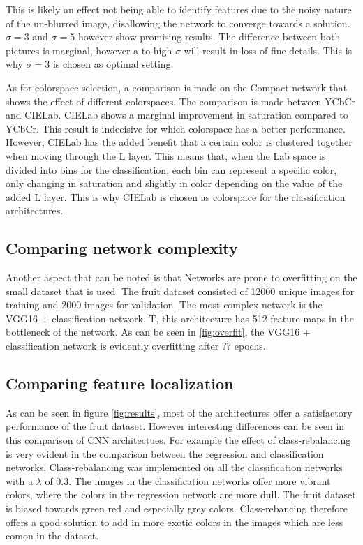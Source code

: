 {\color{red}
This is likely an effect not being able to identify features due to the noisy nature of the un-blurred image, disallowing the network to converge towards a solution. $\sigma = 3$ and $\sigma = 5$ however show promising results. The difference between both pictures is marginal, however a to high $\sigma$ will result in loss of fine details. This is why $\sigma = 3$ is chosen as optimal setting.}

As for colorspace selection, a comparison is made on the Compact network that shows the effect of different colorspaces. The comparison is made between YCbCr and CIELab. CIELab shows a marginal improvement in saturation compared to YCbCr. This result is indecisive for which colorspace has a better performance. However, CIELab has the added benefit that a certain color is clustered together when moving through the L layer. This means that, when the Lab space is divided into bins for the classification, each bin can represent a specific color, only changing in saturation and slightly in color depending on the value of the added L layer. This is why CIELab is chosen as colorspace for the classification architectures.


\subsection{Comparing network complexity}
Another aspect that can be noted is that Networks are prone to overfitting on the small dataset that is used. The fruit dataset consisted of 12000 unique images for training and 2000 images for validation. The most complex network is the VGG16 + classification network. T, this architecture has 512 feature maps in the bottleneck of the network. As can be seen in \ref{fig:overfit}, the VGG16 + classification network is evidently overfitting after ?? epochs. 

\subsection{Comparing feature localization}
As can be seen in figure \ref{fig:results}, most of the architectures offer a satisfactory performance of the fruit dataset. However interesting differences can be seen in this comparison of CNN architectues. For example the effect of class-rebalancing is very evident in the comparison between the regression and classification networks. Class-rebalancing was implemented on all the classification networks with a $\lambda$ of 0.3. The images in the classification networks offer more vibrant colors, where the colors in the regression network are more dull. The fruit dataset is biased towards green red and especially grey colors. Class-rebancing therefore offers a good solution to add in more exotic colors in the images which are less comon in the dataset.

